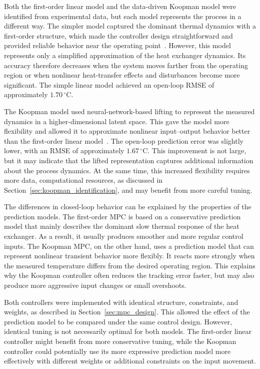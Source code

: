 Both the first-order linear model and the data-driven Koopman model were identified from experimental data, but each model represents the process in a different way. The simpler model captured the dominant thermal dynamics with a first-order structure, which made the controller design straightforward and provided reliable behavior near the operating point~\cite{morari1999}. However, this model represents only a simplified approximation of the heat exchanger dynamics. Its accuracy therefore decreases when the system moves farther from the operating region or when nonlinear heat-transfer effects and disturbances become more significant. The simple linear model achieved an open-loop RMSE of approximately $1.70\,^\circ$C.

The Koopman model used neural-network-based lifting to represent the measured dynamics in a higher-dimensional latent space. This gave the model more flexibility and allowed it to approximate nonlinear input--output behavior better than the first-order linear model~\cite{ otto2019linearly}. The open-loop prediction error was slightly lower, with an RMSE of approximately $1.67\,^\circ$C. This improvement is not large, but it may indicate that the lifted representation captures additional information about the process dynamics. At the same time, this increased flexibility requires more data, computational resources, as discussed in Section~\ref{sec:koopman_identification}, and may benefit from more careful tuning. 

The differences in closed-loop behavior can be explained by the properties of the prediction models. The first-order MPC is based on a conservative prediction model that mainly describes the dominant slow thermal response of the heat exchanger. As a result, it usually produces smoother and more regular control inputs. The Koopman MPC, on the other hand, uses a prediction model that can represent nonlinear transient behavior more flexibly. It reacts more strongly when the measured temperature differs from the desired operating region. This explains why the Koopman controller often reduces the tracking error faster, but may also produce more aggressive input changes or small overshoots.

Both controllers were implemented with identical structure, constraints, and weights, as described in Section~\ref{sec:mpc_design}. This allowed the effect of the prediction model to be compared under the same control design. However, identical tuning is not necessarily optimal for both models. The first-order linear controller might benefit from more conservative tuning, while the Koopman controller could potentially use its more expressive prediction model more effectively with different weights or additional constraints on the input movement.

